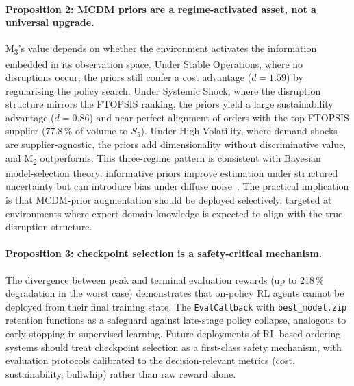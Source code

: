\documentclass[preprint,12pt]{elsarticle}
\begin{document}
\paragraph{Proposition 2: MCDM priors are a regime-activated asset, not a universal upgrade.}
M\textsubscript{3}'s value depends on whether the environment activates the information embedded in its observation space.
Under Stable Operations, where no disruptions occur, the priors still confer a cost advantage ($d = 1.59$) by regularising the policy search.
Under Systemic Shock, where the disruption structure mirrors the FTOPSIS ranking, the priors yield a large sustainability advantage ($d = 0.86$) and near-perfect alignment of orders with the top-FTOPSIS supplier (77.8\,\% of volume to $S_5$).
Under High Volatility, where demand shocks are supplier-agnostic, the priors add dimensionality without discriminative value, and M\textsubscript{2} outperforms.
This three-regime pattern is consistent with Bayesian model-selection theory: informative priors improve estimation under structured uncertainty but can introduce bias under diffuse noise~\citep{Chen_Kumar_2024}.
The practical implication is that MCDM-prior augmentation should be deployed selectively, targeted at environments where expert domain knowledge is expected to align with the true disruption structure.

\paragraph{Proposition 3: checkpoint selection is a safety-critical mechanism.}
The divergence between peak and terminal evaluation rewards (up to 218\,\% degradation in the worst case) demonstrates that on-policy RL agents cannot be deployed from their final training state.
The \texttt{EvalCallback} with \texttt{best\_model.zip} retention functions as a safeguard against late-stage policy collapse, analogous to early stopping in supervised learning.
Future deployments of RL-based ordering systems should treat checkpoint selection as a first-class safety mechanism, with evaluation protocols calibrated to the decision-relevant metrics (cost, sustainability, bullwhip) rather than raw reward alone.
\end{document}
